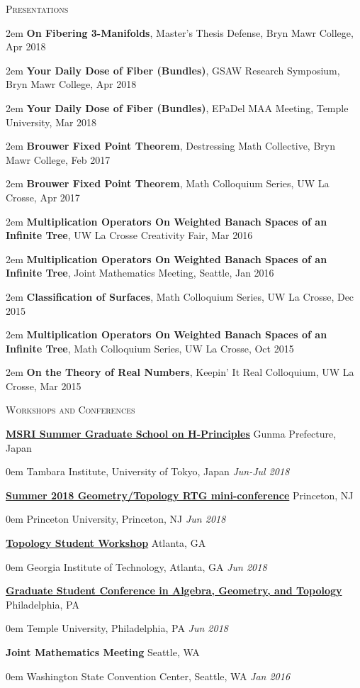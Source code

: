 \documentclass[11pt]{article}
\newenvironment{headitem}[2]{\vskip5pt \hspace{.5em} \textbf{#1} \hfill #2 \begin{addmargin}[0em]{0em}}{\end{addmargin}}
\renewenvironment{section}[1]{\textsc{\large #1}}{\vskip10pt}
\newcommand{\itemreg}[1]{\begin{addmargin}[.75em]{2em} #1 \end{addmargin}}
\newcommand{\itemdate}[2]{\hspace{.5em} #1 \hfill \textit{#2} \\}
\begin{document}
\begin{section}{Presentations}\vskip5pt 
	\itemreg{\textbf{On Fibering 3-Manifolds}, Master's Thesis Defense, Bryn Mawr College, Apr 2018} \vskip2pt
	\itemreg{\textbf{Your Daily Dose of Fiber (Bundles)}, GSAW Research Symposium, Bryn Mawr College, Apr 2018} \vskip2pt
	\itemreg{\textbf{Your Daily Dose of Fiber (Bundles)}, EPaDel MAA Meeting, Temple University, Mar 2018} \vskip2pt
	\itemreg{\textbf{Brouwer Fixed Point Theorem}, Destressing Math Collective, Bryn Mawr College, Feb 2017} \vskip2pt
	\itemreg{\textbf{Brouwer Fixed Point Theorem}, Math Colloquium Series, UW La Crosse, Apr 2017} \vskip2pt
	\itemreg{\textbf{Multiplication Operators On Weighted Banach Spaces of an Infinite Tree}, UW La Crosse Creativity Fair, Mar 2016} \vskip2pt
	\itemreg{\textbf{Multiplication Operators On Weighted Banach Spaces of an Infinite Tree}, Joint Mathematics Meeting, Seattle, Jan 2016} \vskip2pt
	\itemreg{\textbf{Classification of Surfaces}, Math Colloquium Series, UW La Crosse, Dec 2015} \vskip2pt
	\itemreg{\textbf{Multiplication Operators On Weighted Banach Spaces of an Infinite Tree}, Math Colloquium Series, UW La Crosse, Oct 2015} \vskip2pt
	\itemreg{\textbf{On the Theory of Real Numbers}, Keepin' It Real Colloquium, UW La Crosse, Mar 2015} 
\end{section}



\begin{section}{Workshops and Conferences}

	\begin{headitem}{\href{http://www.msri.org/web/msri/scientific/workshops/summer-graduate-school}{MSRI Summer Graduate School on H-Principles}}{Gunma Prefecture, Japan}
		\itemdate{Tambara Institute, University of Tokyo, Japan}{Jun-Jul 2018}
	\end{headitem}
	
	\begin{headitem}{\href{https://web.math.princeton.edu/~petero/RTG/MiniConf1.html}{Summer 2018 Geometry/Topology RTG mini-conference}}{Princeton, NJ}
		\itemdate{Princeton University, Princeton, NJ}{Jun 2018}
	\end{headitem}
	
	\begin{headitem}{\href{http://people.math.gatech.edu/~dmargalit7/tsw18/index.shtml}{Topology Student Workshop}}{Atlanta, GA}
		\itemdate{Georgia Institute of Technology, Atlanta, GA}{Jun 2018}
	\end{headitem}
	
	\begin{headitem}{\href{https://math.temple.edu/events/conferences/gscagt/}{Graduate Student Conference in Algebra, Geometry, and Topology}}{Philadelphia, PA}
		\itemdate{Temple University, Philadelphia, PA}{Jun 2018}
	\end{headitem}

	\begin{headitem}{Joint Mathematics Meeting}{Seattle, WA}
		\itemdate{Washington State Convention Center, Seattle, WA}{Jan 2016}
	\end{headitem}

\end{section}
\end{document}
